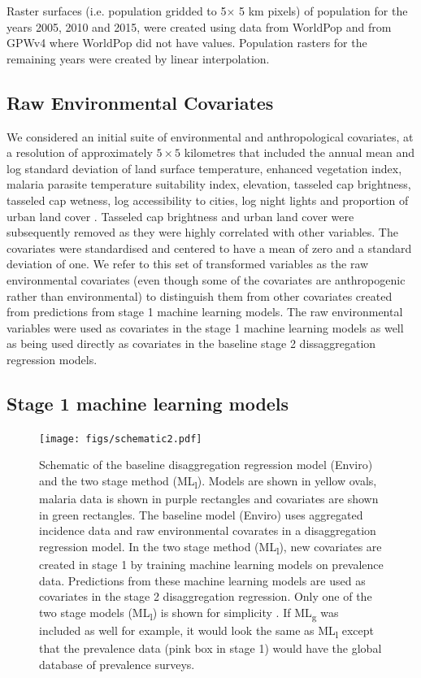 \documentclass[review]{elsarticle}
\begin{document}
Raster surfaces (i.e. population gridded to 5$ \times$ 5 km pixels) of population for the years 2005, 2010 and 2015, were created using data from WorldPop \citep{linard2012population,gaughan2013high,  sorichetta2015high} and from GPWv4 \citep{gpw4} where WorldPop did not have values. 
Population rasters for the remaining years were created by linear interpolation. 

\subsection{Raw Environmental Covariates}

We considered an initial suite of environmental and anthropological covariates, at a resolution of approximately $5 \times 5$ kilometres that included the annual mean and log standard deviation of land surface temperature, enhanced vegetation index, malaria parasite temperature suitability index, elevation, tasseled cap brightness, tasseled cap wetness, log accessibility to cities, log night lights and proportion of urban land cover \citep{weiss2014air, weiss2015re, weiss2018global, gething2011modelling}. 
Tasseled cap brightness and urban land cover were subsequently removed as they were highly correlated with other variables. 
The covariates were standardised and centered to have a mean of zero and a standard deviation of one. 
We refer to this set of transformed variables as the raw environmental covariates (even though some of the covariates are anthropogenic rather than environmental) to distinguish them from other covariates created from predictions from stage 1 machine learning models.
The raw environmental variables were used as covariates in the stage 1 machine learning models as well as being used directly as covariates in the baseline stage 2 dissaggregation regression models.



\subsection{Stage 1 machine learning models}


\begin{figure}[t!]
  \centering
  \texttt{[image: figs/schematic2.pdf]}
\caption{
  Schematic of the baseline disaggregation regression model (Enviro) and the two stage method (ML\textsubscript{l}). 
  Models are shown in yellow ovals, malaria data is shown in purple rectangles and covariates are shown in green rectangles.
  The baseline model (Enviro) uses aggregated incidence data and raw environmental covarates in a disaggregation regression model.
  In the two stage method (ML\textsubscript{l}), new covariates are created in stage 1 by training machine learning models on prevalence data.
  Predictions from these machine learning models are used as covariates in the stage 2 disaggregation regression.
  Only one of the two stage models (ML\textsubscript{l}) is shown for simplicity .
  If ML\textsubscript{g} was included as well for example, it would look the same as ML\textsubscript{l} except that the prevalence data (pink box in stage 1) would have the global database of prevalence surveys.
}
\label{f:schem}
\end{figure}
\end{document}
